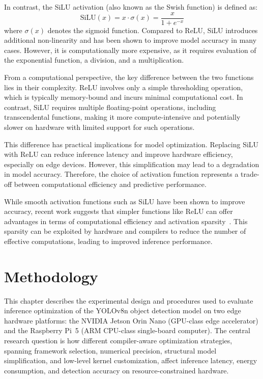 \documentclass[12pt,a4paper]{report}
\begin{document}
In contrast, the SiLU activation (also known as the Swish function) is defined as:
\begin{equation}
\text{SiLU}(x) = x \cdot \sigma(x) = \frac{x}{1 + e^{-x}}
\end{equation}
where $\sigma(x)$ denotes the sigmoid function. Compared to ReLU, SiLU introduces additional non-linearity and has
been shown to improve model accuracy in many cases. However, it is computationally more expensive, as it requires
evaluation of the exponential function, a division, and a multiplication.

From a computational perspective, the key difference between the two functions lies in their complexity. ReLU involves
only a simple thresholding operation, which is typically memory-bound and incurs minimal computational cost. In
contrast, SiLU requires multiple floating-point operations, including transcendental functions, making it more
compute-intensive and potentially slower on hardware with limited support for such operations.

This difference has practical implications for model optimization. Replacing SiLU with ReLU can reduce inference
latency and improve hardware efficiency, especially on edge devices. However, this simplification may lead to a
degradation in model accuracy. Therefore, the choice of activation function represents a trade-off between
computational efficiency and predictive performance.

While smooth activation functions such as SiLU have been shown to improve accuracy, recent work suggests that simpler
functions like ReLU can offer advantages in terms of computational efficiency and activation
sparsity~\cite{mirzadeh2023relu}.
This sparsity can be exploited by hardware and compilers to reduce the number of
effective computations, leading to improved inference performance.

\chapter{Methodology}
\noindent

This chapter describes the experimental design and procedures used to evaluate inference optimization
of the YOLOv8n object detection model on two edge hardware platforms: the NVIDIA Jetson Orin Nano
(GPU-class edge accelerator) and the Raspberry Pi~5 (ARM CPU-class single-board computer).
The central research question is how different compiler-aware optimization strategies, spanning
framework selection, numerical precision, structural model simplification, and low-level kernel
customization, affect inference latency, energy consumption, and detection accuracy on
resource-constrained hardware.
\end{document}
